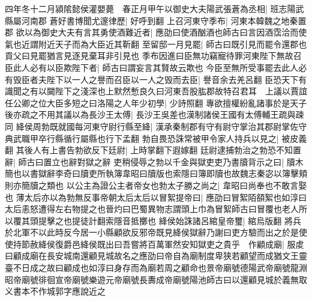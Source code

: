 四年冬十二月潁隂懿侯灌嬰薨　春正月甲午以御史大夫陽武張蒼為丞相|{
	班志陽武縣屬河南郡}
蒼好書博聞尤邃律歷|{
	好呼到翻}
上召河東守季布|{
	河東本韓魏之地秦置郡}
欲以為御史大夫有言其勇使酒難近者|{
	應劭曰使酒酗酒也師古曰言因酒霑洽而使氣也近謂附近天子而為大臣近其靳翻}
至留邸一月見罷|{
	師古曰既引見而罷令還郡也貢父曰見罷猶言見逐見棄耳非引見也}
季布因進曰臣無功竊寵待罪河東陛下無故召臣此人必有以臣欺陛下者|{
	師古曰謂妄言其賢故云欺也}
今臣至無所受事罷去此人必有毁臣者夫陛下以一人之譽而召臣以一人之毁而去臣|{
	譽音余去羌呂翻}
臣恐天下有識聞之有以闚陛下之淺深也上默然慙良久曰河東吾股肱郡故特召君耳　上議以賈誼任公卿之位大臣多短之曰洛陽之人年少初學|{
	少詩照翻}
專欲擅權紛亂諸事於是天子後亦疏之不用其議以為長沙王太傅|{
	長沙王吳差也漢制諸侯王國有太傅輔王疏與疎同}
絳侯周勃既就國每河東守尉行縣至絳|{
	漢承秦制郡有守有尉守掌治其郡尉掌佐守典武職甲卒行縣循行屬縣也行下孟翻}
勃自畏恐誅常被甲令家人持兵以見之|{
	被皮義翻}
其後人有上書告勃欲反下廷尉|{
	上時掌翻下遐嫁翻}
廷尉逮捕勃治之勃恐不知置辭|{
	師古曰置立也辭對獄之辭}
吏稍侵辱之勃以千金與獄吏吏乃書牘背示之曰|{
	牘木簡也以書獄辭李奇曰牘吏所執簿韋昭曰牘版也索隱曰簿即牘也故魏志秦宓以簿擊頬則亦簡牘之類也}
以公主為證公主者帝女也勃太子勝之尚之|{
	韋昭曰尚奉也不敢言娶也}
薄太后亦以為勃無反事帝朝太后太后以冒絮提帝曰|{
	應劭曰冒絮陌頟絮也如淳曰太后恚怒遭得左右物提之也晉灼曰巴蜀異物志謂頭上巾為冒絮師古曰冒覆也老人所以覆其頭提擊之也提徒計翻索隱音抵擲也}
絳侯始誅諸呂綰皇帝璽|{
	綰烏版翻}
將兵於北軍不以此時反今居一小縣顧欲反邪帝既見絳侯獄辭乃謝曰吏方驗而出之於是使使持節赦絳侯復爵邑絳侯既出曰吾嘗將百萬軍然安知獄吏之貴乎　作顧成廟|{
	服䖍曰顧成廟在長安城南還顧見城故名之應劭曰帝自為廟制度卑狭若顧望而成猶文王靈臺不日成之故曰顧成也如淳曰身存而為廟若周之顧命也景帝廟號德陽武帝廟號龍淵昭帝廟號徘徊宣帝廟號樂遊元帝廟號長夀成帝廟號陽池師古曰以還顧見城於義無取义書本不作城郭字應說近之}


